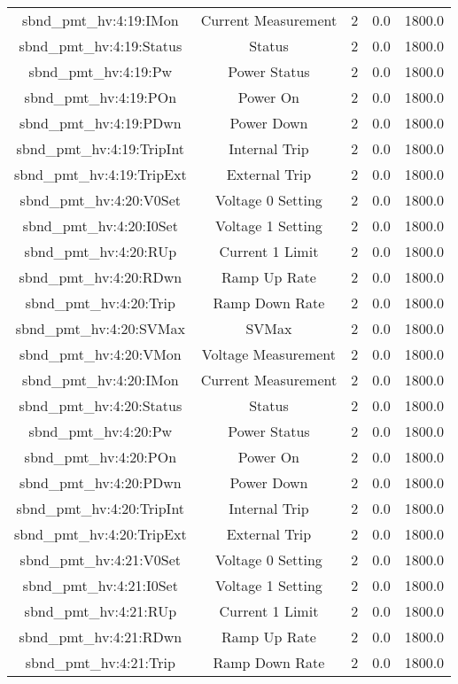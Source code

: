 \begin{table}[ptb]
\begin{tabular}{c | c c c c}
sbnd_pmt_hv:4:19:IMon & Current Measurement & 2 & 0.0 & 1800.0\\ 
sbnd_pmt_hv:4:19:Status & Status & 2 & 0.0 & 1800.0\\ 
sbnd_pmt_hv:4:19:Pw & Power Status & 2 & 0.0 & 1800.0\\ 
sbnd_pmt_hv:4:19:POn & Power On & 2 & 0.0 & 1800.0\\ 
sbnd_pmt_hv:4:19:PDwn & Power Down & 2 & 0.0 & 1800.0\\ 
sbnd_pmt_hv:4:19:TripInt & Internal Trip & 2 & 0.0 & 1800.0\\ 
sbnd_pmt_hv:4:19:TripExt & External Trip & 2 & 0.0 & 1800.0\\ 
sbnd_pmt_hv:4:20:V0Set & Voltage 0 Setting & 2 & 0.0 & 1800.0\\ 
sbnd_pmt_hv:4:20:I0Set & Voltage 1 Setting & 2 & 0.0 & 1800.0\\ 
sbnd_pmt_hv:4:20:RUp & Current 1 Limit & 2 & 0.0 & 1800.0\\ 
sbnd_pmt_hv:4:20:RDwn & Ramp Up Rate & 2 & 0.0 & 1800.0\\ 
sbnd_pmt_hv:4:20:Trip & Ramp Down Rate & 2 & 0.0 & 1800.0\\ 
sbnd_pmt_hv:4:20:SVMax & SVMax & 2 & 0.0 & 1800.0\\ 
sbnd_pmt_hv:4:20:VMon & Voltage Measurement & 2 & 0.0 & 1800.0\\ 
sbnd_pmt_hv:4:20:IMon & Current Measurement & 2 & 0.0 & 1800.0\\ 
sbnd_pmt_hv:4:20:Status & Status & 2 & 0.0 & 1800.0\\ 
sbnd_pmt_hv:4:20:Pw & Power Status & 2 & 0.0 & 1800.0\\ 
sbnd_pmt_hv:4:20:POn & Power On & 2 & 0.0 & 1800.0\\ 
sbnd_pmt_hv:4:20:PDwn & Power Down & 2 & 0.0 & 1800.0\\ 
sbnd_pmt_hv:4:20:TripInt & Internal Trip & 2 & 0.0 & 1800.0\\ 
sbnd_pmt_hv:4:20:TripExt & External Trip & 2 & 0.0 & 1800.0\\ 
sbnd_pmt_hv:4:21:V0Set & Voltage 0 Setting & 2 & 0.0 & 1800.0\\ 
sbnd_pmt_hv:4:21:I0Set & Voltage 1 Setting & 2 & 0.0 & 1800.0\\ 
sbnd_pmt_hv:4:21:RUp & Current 1 Limit & 2 & 0.0 & 1800.0\\ 
sbnd_pmt_hv:4:21:RDwn & Ramp Up Rate & 2 & 0.0 & 1800.0\\ 
sbnd_pmt_hv:4:21:Trip & Ramp Down Rate & 2 & 0.0 & 1800.0\\ 

\end{tabular}
\end{table}
